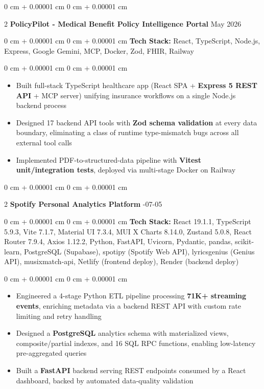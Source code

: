 \documentclass[9pt, letterpaper]{article}
\newenvironment{highlights}{
    \begin{itemize}[
        topsep=0.05 cm,
        parsep=0 pt,
        partopsep=0pt,
        itemsep=0pt,
        leftmargin=10pt
    ]
}{
    \end{itemize}
} %
\newenvironment{onecolentry}{
    \begin{adjustwidth}{
        0 cm + 0.00001 cm}{
        0 cm + 0.00001 cm}
}{
    \end{adjustwidth}
} %
\newenvironment{twocolentry}[2][]{
    \onecolentry
    \def\secondColumn{#2}
    \setcolumnwidth{\fill, 4.5 cm}
    \begin{paracol}{2}
}{
    \switchcolumn \raggedleft \secondColumn
    \end{paracol}
    \endonecolentry
} %
\begin{document}
    \begin{twocolentry}
        {May 2026}\textbf{PolicyPilot - Medical Benefit Policy Intelligence Portal}    \end{twocolentry}
    \begin{onecolentry}\textbf{Tech Stack:} React, TypeScript, Node.js, Express, Google Gemini, MCP, Docker, Zod, FHIR, Railway \end{onecolentry}
    \begin{onecolentry}
        \begin{highlights}
            \item Built full-stack TypeScript healthcare app (React SPA + \textbf{Express 5 REST API} + MCP server) unifying insurance workflows on a single Node.js backend process
            \item Designed 17 backend API tools with \textbf{Zod schema validation} at every data boundary, eliminating a class of runtime type-mismatch bugs across all external tool calls
            \item Implemented PDF-to-structured-data pipeline with \textbf{Vitest unit/integration tests}, deployed via multi-stage Docker on Railway
        \end{highlights}
    \end{onecolentry}
    \vspace{0.04 cm}

    \begin{twocolentry}
        {2026-07-05}\textbf{Spotify Personal Analytics Platform}    \end{twocolentry}
    \begin{onecolentry}\textbf{Tech Stack:} React 19.1.1, TypeScript 5.9.3, Vite 7.1.7, Material UI 7.3.4, MUI X Charts 8.14.0, Zustand 5.0.8, React Router 7.9.4, Axios 1.12.2, Python, FastAPI, Uvicorn, Pydantic, pandas, scikit-learn, PostgreSQL (Supabase), spotipy (Spotify Web API), lyricsgenius (Genius API), musixmatch-api, Netlify (frontend deploy), Render (backend deploy) \end{onecolentry}
    \begin{onecolentry}
        \begin{highlights}
            \item Engineered a 4-stage Python ETL pipeline processing \textbf{71K+ streaming events}, enriching metadata via a backend REST API with custom rate limiting and retry handling
            \item Designed a \textbf{PostgreSQL} analytics schema with materialized views, composite/partial indexes, and 16 SQL RPC functions, enabling low-latency pre-aggregated queries
            \item Built a \textbf{FastAPI} backend serving REST endpoints consumed by a React dashboard, backed by automated data-quality validation
        \end{highlights}
    \end{onecolentry}
\end{document}
